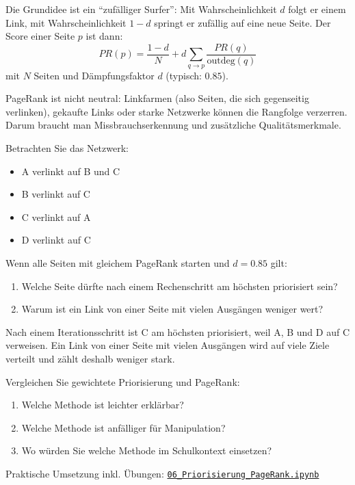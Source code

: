 Die Grundidee ist ein \enquote{zufälliger Surfer}:
Mit Wahrscheinlichkeit $d$ folgt er einem Link, mit Wahrscheinlichkeit $1-d$ springt er zufällig auf eine neue Seite.
Der Score einer Seite $p$ ist dann:
\[
PR(p) = \frac{1-d}{N} + d \sum_{q \to p} \frac{PR(q)}{\text{outdeg}(q)}
\]
mit $N$ Seiten und Dämpfungsfaktor $d$ (typisch: $0.85$).

\begin{mycaution}
PageRank ist nicht neutral: Linkfarmen (also Seiten, die sich gegenseitig verlinken), gekaufte Links oder starke Netzwerke können die Rangfolge verzerren.
Darum braucht man Missbrauchserkennung und zusätzliche Qualitätsmerkmale.
\end{mycaution}

\begin{myexercise}
Betrachten Sie das Netzwerk:
\begin{itemize}
    \item A verlinkt auf B und C
    \item B verlinkt auf C
    \item C verlinkt auf A
    \item D verlinkt auf C
\end{itemize}
Wenn alle Seiten mit gleichem PageRank starten und $d=0.85$ gilt:
\begin{enumerate}
    \item Welche Seite dürfte nach einem Rechenschritt am höchsten priorisiert sein?
    \item Warum ist ein Link von einer Seite mit vielen Ausgängen weniger wert?
\end{enumerate}
\begin{myanswer}
Nach einem Iterationsschritt ist C am höchsten priorisiert, weil A, B und D auf C verweisen.
Ein Link von einer Seite mit vielen Ausgängen wird auf viele Ziele verteilt und zählt deshalb weniger stark.
\end{myanswer}
\end{myexercise}

\begin{mychallenge}
Vergleichen Sie gewichtete Priorisierung und PageRank:
\begin{enumerate}
    \item Welche Methode ist leichter erklärbar?
    \item Welche Methode ist anfälliger für Manipulation?
    \item Wo würden Sie welche Methode im Schulkontext einsetzen?
\end{enumerate}
\end{mychallenge}

\begin{myremark}[Notebook]
Praktische Umsetzung inkl. Übungen:
\href{\notebookbaseurl06_Priorisierung_PageRank.ipynb}{\texttt{06\_Priorisierung\_PageRank.ipynb}}
\end{myremark}
